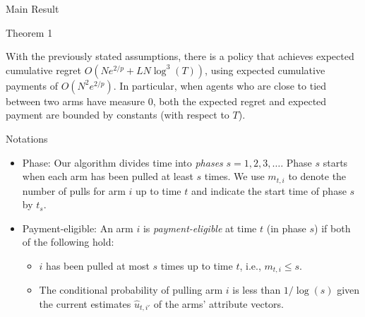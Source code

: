 \documentclass[serif]{beamer}
\begin{document}
\begin{frame}{Main Result}
\begin{block}{Theorem 1}

With the previously stated assumptions, there is a policy that achieves expected 
cumulative regret $O (N e^{2/p} + L N \log^3(T))$,
using expected cumulative payments of $O(N^2 e^{2/p})$.
\newline
\newline
In particular, when agents who are close to tied between two arms have measure $0$,
both the expected regret and expected payment are bounded by constants
(with respect to $T$). 

\end{block}

\end{frame}
\begin{frame}{Notations}

\begin{itemize}[label=\textbullet]
\item<1-> Phase: Our algorithm divides time into \emph{phases} $s = 1, 2, 3, \ldots$. Phase $s$ starts when each arm has been pulled at least $s$ times. We use $m_{t,i}$ to denote the number of pulls for arm $i$ up to time $t$ and indicate the start time of phase $s$ by $t_s$. 
\item<2-> Payment-eligible: An arm $i$ is \emph{payment-eligible} at time $t$ (in phase $s$) if both of the following hold:
\begin{itemize}[label=\textbullet]
\item $i$ has been pulled at most $s$ times up to time $t$, i.e., $m_{t,i} \leq s$.
\item  The conditional probability of pulling arm $i$ is less than $1/\log(s)$ given the current estimates $\hat{u}_{t,i'}$ of the arms' attribute vectors.  
\end{itemize}
\end{itemize}

\end{frame}
\end{document}
